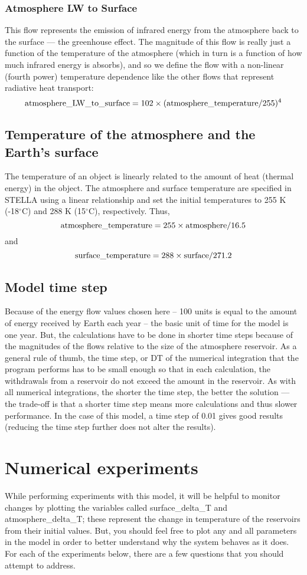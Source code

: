 \documentclass[11pt,letterpaper]{article}
\begin{document}
\subsubsection*{Atmosphere LW to Surface}
This flow represents the emission of infrared energy from the atmosphere back to the surface --- the greenhouse effect. The magnitude
of this flow is really just a function of the temperature of the atmosphere (which in turn is a function of how much infrared energy is
absorbs), and so we define the flow with a non-linear (fourth power) temperature dependence like the other flows that represent
radiative heat transport:
$$\rm atmosphere\_LW\_to\_surface = 102\times(atmosphere\_temperature/255)^4$$

\subsection{Temperature of the atmosphere and the Earth's surface}
The temperature of an object is linearly related to the amount of heat (thermal energy) in the object. The atmosphere and surface temperature are specified in STELLA using a linear relationship and set the initial temperatures to 255 K (-18$^\circ$C) and 288 K (15$^\circ$C), respectively. Thus,
$$\rm atmosphere\_temperature = 255\times atmosphere/16.5$$
and
$$\rm surface\_temperature = 288\times surface/271.2$$

\subsection{Model time step}
Because of the energy flow values chosen here -- 100 units is equal to the amount of energy received by Earth each year -- the basic unit of time for the model is one year. But, the calculations have to be done in shorter time steps because of the magnitudes of the flows relative to the size of the atmosphere reservoir. As a general rule of thumb, the time step, or DT of the numerical integration that the program performs has to be small enough so that in each calculation, the withdrawals from a reservoir do not exceed the amount in the reservoir. As with all numerical integrations, the shorter the time step, the better the solution --- the trade-off is that a shorter time step means more calculations and thus slower performance. In the case of this model, a time step of 0.01 gives good results (reducing the time step further does not alter the results).

\section{Numerical experiments}
While performing experiments with this model, it will be helpful to monitor changes by plotting the variables called surface\_delta\_T and atmosphere\_delta\_T; these represent the change in temperature of the reservoirs from their initial values. But, you should feel free to plot any and all parameters in the model in order to better understand why the system behaves as it does. For each of the
experiments below, there are a few questions that you should attempt to address. 
\end{document}
